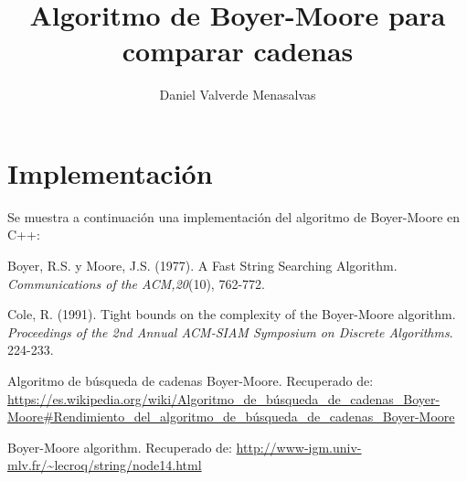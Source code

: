 \documentclass{article}
\begin{document}
\sloppy
\title{Algoritmo de Boyer-Moore para comparar cadenas}

\author{Daniel Valverde Menasalvas}

\maketitle






\section{Implementación}
Se muestra a continuación una implementación del algoritmo de Boyer-Moore en C++:









\begin{thebibliography}{x}
Boyer, R.S. y Moore, J.S. (1977). A Fast String Searching Algorithm. \textit{Communications of the ACM,20}(10), 762-772.

Cole, R. (1991). Tight bounds on the complexity of the Boyer-Moore algorithm. \textit{Proceedings of the 2nd Annual ACM-SIAM Symposium on Discrete Algorithms}. 224-233.

Algoritmo de búsqueda de cadenas Boyer-Moore. Recuperado de: \url{https://es.wikipedia.org/wiki/Algoritmo_de_búsqueda_de_cadenas_Boyer-Moore#Rendimiento_del_algoritmo_de_búsqueda_de_cadenas_Boyer-Moore}

Boyer-Moore algorithm. Recuperado de: \url{http://www-igm.univ-mlv.fr/~lecroq/string/node14.html}


\end{thebibliography}
\end{document}
